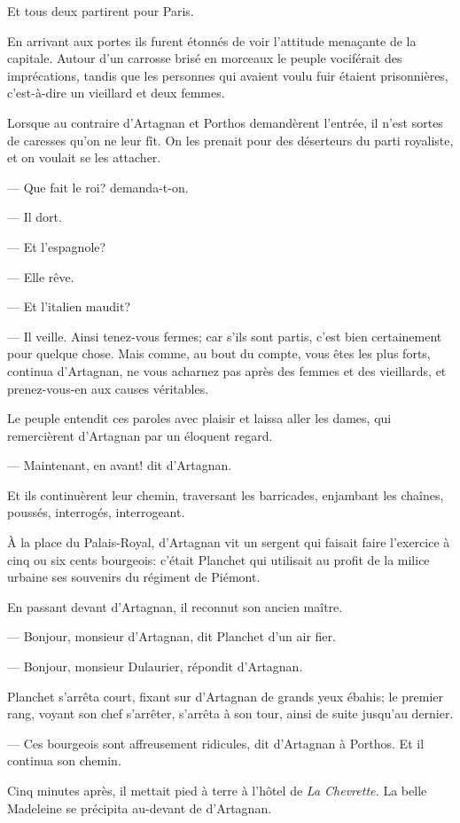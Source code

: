 Et tous deux partirent pour Paris.

En arrivant aux portes ils furent étonnés de voir l'attitude menaçante de la capitale. Autour d'un carrosse brisé en morceaux le peuple vociférait des imprécations, tandis que les personnes qui avaient voulu fuir étaient prisonnières, c'est-à-dire un vieillard et deux femmes.

Lorsque au contraire d'Artagnan et Porthos demandèrent l'entrée, il n'est sortes de caresses qu'on ne leur fît. On les prenait pour des déserteurs du parti royaliste, et on voulait se les attacher.

— Que fait le roi? demanda-t-on.

— Il dort.

— Et l'espagnole?

— Elle rêve.

— Et l'italien maudit?

— Il veille. Ainsi tenez-vous fermes; car s'ils sont partis, c'est bien certainement pour quelque chose. Mais comme, au bout du compte, vous êtes les plus forts, continua d'Artagnan, ne vous acharnez pas après des femmes et des vieillards, et prenez-vous-en aux causes véritables.

Le peuple entendit ces paroles avec plaisir et laissa aller les dames, qui remercièrent d'Artagnan par un éloquent regard.

— Maintenant, en avant! dit d'Artagnan.

Et ils continuèrent leur chemin, traversant les barricades, enjambant les chaînes, poussés, interrogés, interrogeant.

À la place du Palais-Royal, d'Artagnan vit un sergent qui faisait faire l'exercice à cinq ou six cents bourgeois: c'était Planchet qui utilisait au profit de la milice urbaine ses souvenirs du régiment de Piémont.

En passant devant d'Artagnan, il reconnut son ancien maître.

— Bonjour, monsieur d'Artagnan, dit Planchet d'un air fier.

— Bonjour, monsieur Dulaurier, répondit d'Artagnan.

Planchet s'arrêta court, fixant sur d'Artagnan de grands yeux ébahis; le premier rang, voyant son chef s'arrêter, s'arrêta à son tour, ainsi de suite jusqu'au dernier.

— Ces bourgeois sont affreusement ridicules, dit d'Artagnan à Porthos.
Et il continua son chemin.

Cinq minutes après, il mettait pied à terre à l'hôtel de \textit{La Chevrette.} La belle Madeleine se précipita au-devant de d'Artagnan.

